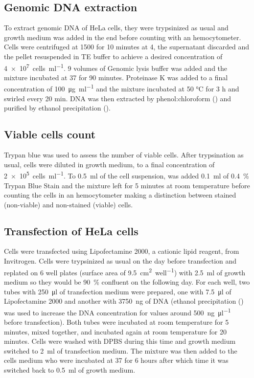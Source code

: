   \subsection{Genomic DNA extraction}
    To extract genomic DNA of HeLa cells, they were trypsinized as usual and
    growth medium was added in the end before counting with an hemocytometer.
    Cells were centrifuged at \SI{1500}{\gn} for 10 minutes at \SI{4}{\dc}, the supernatant discarded
    and the pellet resuspended in TE buffer to achieve a desired concentration of
    \SI{4e7}{cells\per\ml}. 9 volumes of Genomic lysis buffer was added and the mixture
    incubated at \SI{37}{\dc} for 90 minutes. Proteinase K was added to a final concentration of
    \SI{100}{\ug\per\ml} and the mixture incubated at 50 °C for 3 h and swirled every 20 min.
    DNA was then extracted by phenol:chloroform () and purified by ethanol
    precipitation ().

  \subsection{Viable cells count}
    Trypan blue was used to assess the number of viable cells. After trypsination
    as usual, cells were diluted in growth medium, to a final concentration of \SI{2e5}{cells\per\ml}.
    To \SI{0.5}{\ml} of the cell suspension, was added \SI{0.1}{\ml} of \SI{0.4}{\percent} Trypan
    Blue Stain and the mixture left for 5 minutes at room temperature before counting
    the cells in an hemocytometer making a distinction between stained (non-viable)
    and non-stained (viable) cells.

  \subsection{Transfection of HeLa cells}
    Cells were transfected using Lipofectamine 2000, a cationic lipid reagent, from
    Invitrogen. Cells were trypsinized as usual on the day before transfection and
    replated on 6 well plates (surface area of \SI{9.5}{\square\cm\per well}) with \SI{2.5}{\ml} of growth
    medium so they would be \SI{90}{\percent} confluent on the following day. For each well,
    two tubes with \SI{250}{\ul} of transfection medium were prepared, one with \SI{7.5}{\ul}
    of Lipofectamine 2000 and another with \SI{3750}{\ng} of DNA (ethanol precipitation
    () was used to increase the DNA concentration for values around \SI{500}{\ng\per\ul}
    before transfection). Both tubes were incubated at room temperature for 5 minutes,
    mixed together, and incubated again at room temperature for 20 minutes. Cells
    were washed with DPBS during this time and growth medium switched to \SI{2}{\ml}
    of transfection medium. The mixture was then added to the cells medium who
    were incubated at \SI{37}{\dc} for 6 hours after which time it was switched back to
    \SI{0.5}{\ml} of growth medium.

